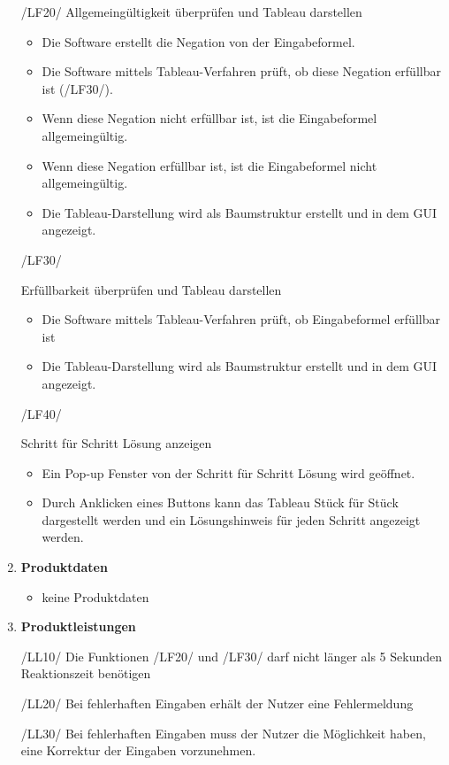 \begin{enumerate}
\hypertarget{/LF20/}{/LF20/} Allgemeingültigkeit überprüfen und Tableau darstellen
\begin{itemize}
\item Die Software erstellt die Negation von der Eingabeformel. 
\item Die Software  mittels Tableau-Verfahren prüft, ob diese Negation erfüllbar ist (/LF30/).
\item Wenn diese Negation nicht erfüllbar ist, ist die Eingabeformel allgemeingültig.
\item Wenn diese Negation erfüllbar ist, ist die Eingabeformel nicht allgemeingültig.
\item Die Tableau-Darstellung wird als Baumstruktur erstellt und in dem GUI angezeigt.
\end{itemize}

\hypertarget{/LF30/}{/LF30/}  Erfüllbarkeit überprüfen und Tableau darstellen
\begin{itemize} 
\item Die Software mittels Tableau-Verfahren prüft, ob Eingabeformel erfüllbar ist
\item Die Tableau-Darstellung wird als Baumstruktur erstellt und in dem GUI angezeigt.
\end{itemize}


\hypertarget{/LF40/}{/LF40/}  Schritt für Schritt Lösung anzeigen
\begin{itemize}
\item Ein Pop-up Fenster von der Schritt für Schritt Lösung wird geöffnet.
\item Durch Anklicken eines Buttons kann das Tableau Stück für Stück dargestellt werden und ein Lösungshinweis für jeden Schritt angezeigt werden.
\end{itemize}

\item \textbf{Produktdaten}
\begin{itemize}
\item keine Produktdaten
\end{itemize}

\item \textbf{Produktleistungen}

/LL10/ Die Funktionen /LF20/ und /LF30/ darf nicht länger als 5 Sekunden Reaktionszeit benötigen

/LL20/ Bei fehlerhaften Eingaben erhält der Nutzer eine Fehlermeldung

/LL30/ Bei fehlerhaften Eingaben muss der Nutzer die Möglichkeit haben, eine Korrektur der Eingaben vorzunehmen.


\end{enumerate}
